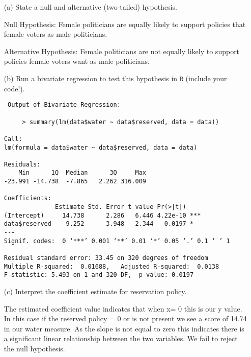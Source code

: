 \newpage
\begin{enumerate}
	\item [(a)] State a null and alternative (two-tailed) hypothesis. 
 
Null Hypothesis: Female politicians are equally likely to support policies that female voters as male politicians.

Alternative Hypothesis: Female politicians are not equally likely to support policies female voters want as male politicians. 

	\vspace{.25cm}
	\item [(b)] Run a bivariate regression to test this hypothesis in \texttt{R} (include your code!).
	
	\vspace{.25cm}

 \begin{verbatim}
 Output of Bivariate Regression:
 
     > summary(lm(data$water ~ data$reserved, data = data))

Call:
lm(formula = data$water ~ data$reserved, data = data)

Residuals:
    Min      1Q  Median      3Q     Max 
-23.991 -14.738  -7.865   2.262 316.009 

Coefficients:
              Estimate Std. Error t value Pr(>|t|)    
(Intercept)     14.738      2.286   6.446 4.22e-10 ***
data$reserved    9.252      3.948   2.344   0.0197 *  
---
Signif. codes:  0 ‘***’ 0.001 ‘**’ 0.01 ‘*’ 0.05 ‘.’ 0.1 ‘ ’ 1

Residual standard error: 33.45 on 320 degrees of freedom
Multiple R-squared:  0.01688,	Adjusted R-squared:  0.0138 
F-statistic: 5.493 on 1 and 320 DF,  p-value: 0.0197
 \end{verbatim}
 
	\item [(c)] Interpret the coefficient estimate for reservation policy. 

The estimated coefficient value indicates that when x= 0 this is our y value. In this case if the reserved policy = 0 or is not present we see a score of 14.74 in our water measure. As the slope is not equal to zero this indicates there is a significant linear relationship between the two variables. We fail to reject the null hypothesis.

\end{enumerate}



